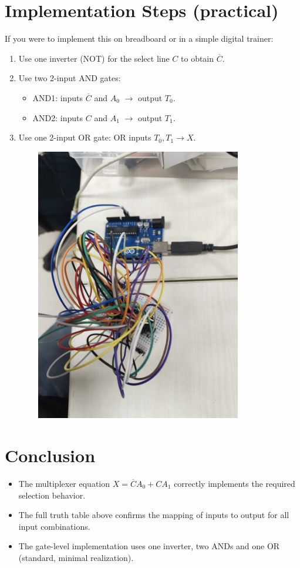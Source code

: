 \documentclass[a4paper,12pt]{article}
\begin{document}
\section*{\textbf{Implementation Steps (practical)}}
If you were to implement this on breadboard or in a simple digital trainer:
\begin{enumerate}
    \item Use one inverter (NOT) for the select line \(C\) to obtain \(\overline{C}\).
    \item Use two 2-input AND gates:
    \begin{itemize}
        \item AND1: inputs \(\overline{C}\) and \(A_0\) $\rightarrow$ output \(T_0\).
        \item AND2: inputs \(C\) and \(A_1\) $\rightarrow$ output \(T_1\).
    \end{itemize}
    \item Use one 2-input OR gate: OR inputs \(T_0, T_1 \rightarrow X\).
\end{enumerate}
\begin{center}
  \includegraphics[width=12cm, height=12cm]{output.jpg}
\end{center}
\section*{\textbf{Conclusion}}
\begin{itemize}
    \item The multiplexer equation \(X=\overline{C}A_0 + C A_1\) correctly implements the required selection behavior.
    \item The full truth table above confirms the mapping of inputs to output for all input combinations.
    \item The gate-level implementation uses one inverter, two ANDs and one OR (standard, minimal realization).
\end{itemize}
\end{document}

